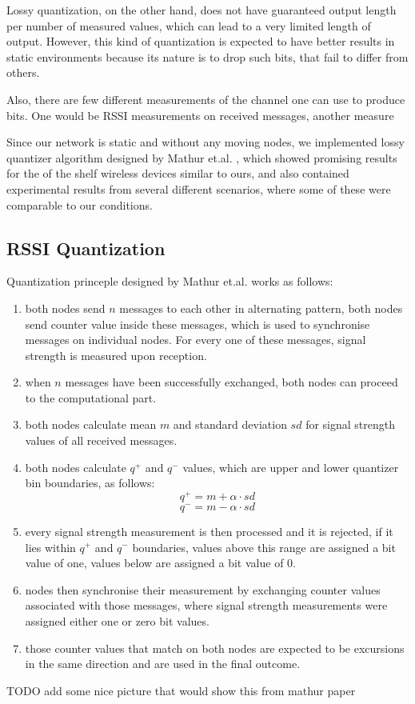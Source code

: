 \documentclass[
  print, %
  table,   %
  nolof,     %
  nolot,     %
           oneside
]{fithesis3}
\begin{document}
    Lossy quantization, on the other hand, does not have guaranteed output length per number of measured values, which can lead to a very limited length of output. However, this kind of quantization is expected to have better results in static environments %
    because its nature is to drop such bits, that fail to differ from others.

    Also, there are few different measurements of the channel one can use to produce bits. One would be RSSI measurements on received messages, another measure %

    Since our network is static and without any moving nodes, we implemented lossy quantizer algorithm designed by Mathur et.al. \cite{Mathur2008Rssi}, which showed promising results for the of the shelf wireless devices similar to ours, and also contained experimental results from several different scenarios, where some of these were comparable to our conditions.



    \subsection{RSSI Quantization}\label{subsec:quant}
    Quantization princeple designed by Mathur et.al. \cite{Mathur2008Rssi}
     works as follows:

    \begin{enumerate}
      \item both nodes send $n$ messages to each other in alternating pattern, both nodes send counter value inside these messages, which is used to synchronise messages on individual nodes. For every one of these messages, signal strength is measured upon reception.
      \item when $n$ messages have been successfully exchanged, both nodes can proceed to the computational part.
      \item both nodes calculate mean $m$ and standard deviation $sd$ for signal strength values of all received messages.
      \item both nodes calculate $q^+$ and $q^-$ values, which are upper and lower quantizer bin boundaries, as follows:
      $$q^+ = m + \alpha \cdot sd$$
      $$q^- = m - \alpha \cdot sd$$
      \item every signal strength measurement is then processed and it is rejected, if it lies within $q^+$ and $q^-$ boundaries, values above this range are assigned a bit value of one, values below are assigned a bit value of 0.
      \item nodes then synchronise their measurement by exchanging counter values associated with those messages, where signal strength measurements were assigned either one or zero bit values.
      \item those counter values that match on both nodes are expected to be excursions in the same direction and are used in the final outcome.


    \end{enumerate}
    TODO add some nice picture that would show this from mathur paper
\end{document}
